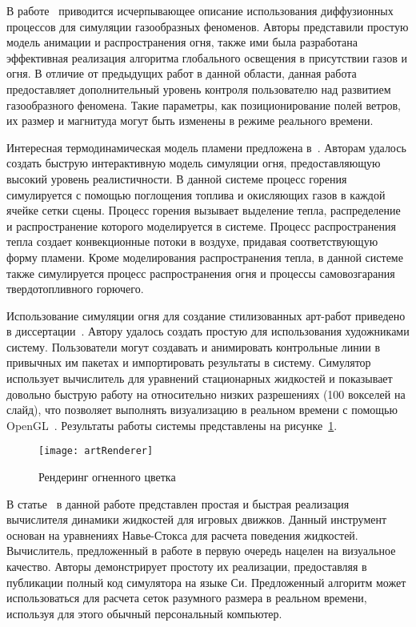 В работе~\cite{DiffusionProcesses} приводится исчерпывающее описание
использования диффузионных процессов для симуляции газообразных феноменов.
Авторы представили простую модель анимации и распространения огня, также ими
была разработана эффективная реализация алгоритма глобального освещения в
присутствии газов и огня. В отличие от предыдущих работ в данной области, данная
работа предоставляет дополнительный уровень контроля пользователю над развитием
газообразного феномена. Такие параметры, как позиционирование полей ветров, их
размер и магнитуда могут быть изменены в режиме реального времени.

Интересная термодинамическая модель пламени предложена
в~\cite{InteractiveSimulation}. Авторам удалось создать быструю интерактивную
модель симуляции огня, предоставляющую высокий уровень реалистичности. В данной
системе процесс горения симулируется с помощью поглощения топлива и окисляющих
газов в каждой ячейке сетки сцены. Процесс горения вызывает выделение тепла,
распределение и распространение которого моделируется в системе. Процесс
распространения тепла создает конвекционные потоки в воздухе, придавая
соответствующую форму пламени. Кроме моделирования распространения тепла, в
данной системе также симулируется процесс распространения огня и процессы
самовозгарания твердотопливного горючего.

Использование симуляции огня для создание стилизованных арт-работ приведено в
диссертации~\cite{Bangalore2012ATF}. Автору удалось создать простую для
использования художниками систему. Пользователи могут создавать и анимировать
контрольные линии в привычных им пакетах и импортировать результаты в систему.
Симулятор использует вычислитель для уравнений стационарных жидкостей и
показывает довольно быструю работу на относительно низких разрешениях (100
вокселей на слайд), что позволяет выполнять визуализацию в реальном времени с
помощью OpenGL~\@. Результаты работы системы представлены на
рисунке~\ref{fig:artRenderer}.
\begin{figure}[htb]
	\centering
    \texttt{[image: artRenderer]}
    \caption{Рендеринг огненного цветка}%
    \label{fig:artRenderer}
\end{figure}

В статье~\cite{ForGames} в данной работе представлен простая и быстрая
реализация вычислителя динамики жидкостей для игровых движков. Данный инструмент
основан на уравнениях Навье-Стокса для расчета поведения жидкостей. Вычислитель,
предложенный в работе в первую очередь нацелен на визуальное качество. Авторы
демонстрирует простоту их реализации, предоставляя в публикации полный код
симулятора на языке Си. Предложенный алгоритм может использоваться для расчета
сеток разумного размера в реальном времени, используя для этого обычный
персональный компьютер.

